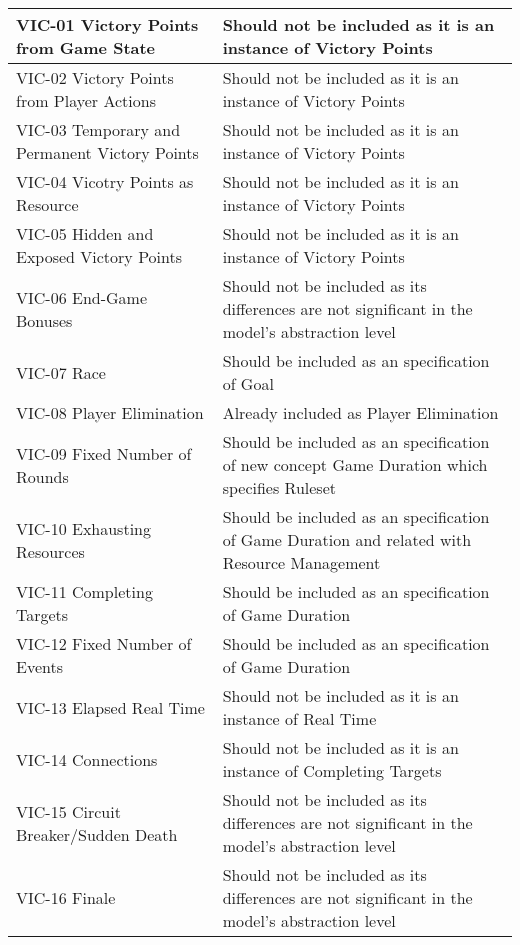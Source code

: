 \begin{longtable}{|m{7cm}|m{7cm}|}
        \hline
        VIC-01 Victory Points from Game State & Should not be included as it is an instance of Victory Points \\
        \hline
        VIC-02 Victory Points from Player Actions & Should not be included as it is an instance of Victory Points \\
        \hline
        VIC-03 Temporary and Permanent Victory Points & Should not be included as it is an instance of Victory Points \\
        \hline
        VIC-04 Vicotry Points as Resource & Should not be included as it is an instance of Victory Points \\
        \hline
        VIC-05 Hidden and Exposed Victory Points & Should not be included as it is an instance of Victory Points \\
        \hline
        VIC-06 End-Game Bonuses & Should not be included as its differences are not significant in the model's abstraction level \\
        \hline
        VIC-07 Race & Should be included as an specification of Goal \\
        \hline
        VIC-08 Player Elimination & Already included as Player Elimination \\
        \hline
        VIC-09 Fixed Number of Rounds & Should be included as an specification of new concept Game Duration which specifies Ruleset \\
        \hline
        VIC-10 Exhausting Resources & Should be included as an specification of Game Duration and related with Resource Management \\
        \hline
        VIC-11 Completing Targets & Should be included as an specification of Game Duration \\
        \hline
        VIC-12 Fixed Number of Events & Should be included as an specification of Game Duration \\
        \hline
        VIC-13 Elapsed Real Time & Should not be included as it is an instance of Real Time \\
        \hline
        VIC-14 Connections & Should not be included as it is an instance of Completing Targets \\
        \hline
        VIC-15 Circuit Breaker/Sudden Death & Should not be included as its differences are not significant in the model's abstraction level \\
        \hline
        VIC-16 Finale & Should not be included as its differences are not significant in the model's abstraction level \\

\end{longtable}
